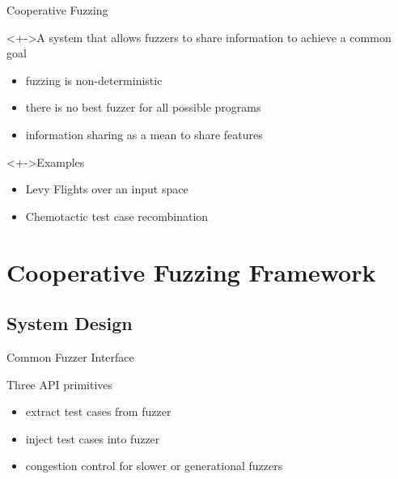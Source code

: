 \documentclass[handout]{beamer}
\begin{document}
\begin{frame}{Cooperative Fuzzing}
    \begin{block}<+->{A system that allows fuzzers to share information to achieve a common goal}
        \begin{itemize}[<+->]
            \item{} fuzzing is non-deterministic
            \item{} there is no best fuzzer for all possible programs
            \item{} information sharing as a mean to share features
        \end{itemize}
    \end{block}
    \begin{exampleblock}<+->{Examples}
        \begin{itemize}
            \item{} Levy Flights over an input space
            \item{} Chemotactic test case recombination
        \end{itemize}
    \end{exampleblock}
\end{frame}

\section{Cooperative Fuzzing Framework}

\subsection{System Design}

\begin{frame}{Common Fuzzer Interface}
    \begin{block}{Three API primitives}
        \begin{itemize}[<+->]
            \item{} \alert{extract} test cases from fuzzer
            \item{} \alert{inject} test cases into fuzzer
            \item{} \alert{congestion control} for slower or generational
                fuzzers
        \end{itemize}
    \end{block}
\end{frame}
\end{document}
